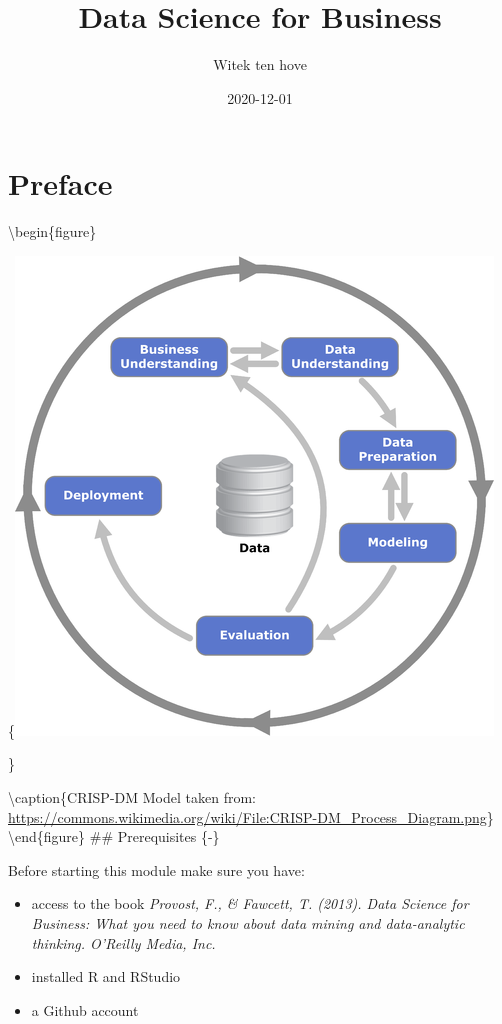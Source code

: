 \documentclass[
]{book}
\title{Data Science for Business}
\author{Witek ten hove}
\date{2020-12-01}
\providecommand{\tightlist}{%
  \setlength{\itemsep}{0pt}\setlength{\parskip}{0pt}}
\begin{document}
\maketitle

{
\setcounter{tocdepth}{1}
\tableofcontents
}
\hypertarget{preface}{%
\chapter*{Preface}\label{preface}}

\textbackslash begin\{figure\}

\{\centering \includegraphics[width=0.8\linewidth]{images/crisp}

\}

\textbackslash caption\{CRISP-DM Model taken from: \url{https://commons.wikimedia.org/wiki/File:CRISP-DM_Process_Diagram.png}\}\label{fig:title-fig}
\textbackslash end\{figure\}
\#\# Prerequisites \{-\}

Before starting this module make sure you have:

\begin{itemize}
\tightlist
\item
  access to the book \emph{Provost, F., \& Fawcett, T. (2013). Data Science for Business: What you need to know about data mining and data-analytic thinking. O'Reilly Media, Inc.}
\item
  installed R and RStudio
\item
  a Github account
\end{itemize}
\end{document}
